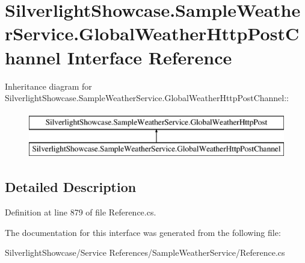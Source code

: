 \hypertarget{interface_silverlight_showcase_1_1_sample_weather_service_1_1_global_weather_http_post_channel}{
\section{SilverlightShowcase.SampleWeatherService.GlobalWeatherHttpPostChannel Interface Reference}
\label{interface_silverlight_showcase_1_1_sample_weather_service_1_1_global_weather_http_post_channel}
}
Inheritance diagram for SilverlightShowcase.SampleWeatherService.GlobalWeatherHttpPostChannel::\begin{figure}[H]
\begin{center}
\leavevmode
\includegraphics[height=2cm]{interface_silverlight_showcase_1_1_sample_weather_service_1_1_global_weather_http_post_channel}
\end{center}
\end{figure}


\subsection{Detailed Description}


Definition at line 879 of file Reference.cs.

The documentation for this interface was generated from the following file:\begin{DoxyCompactItemize}
\item 
SilverlightShowcase/Service References/SampleWeatherService/Reference.cs\end{DoxyCompactItemize}
